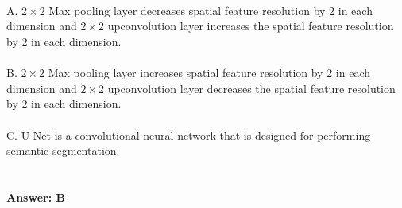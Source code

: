 \documentclass[prl,twocolumn,showpacs,preprintnumbers,superscriptaddress]{revtex4}
\theoremstyle{plain}
\theoremstyle{definition}
\begin{document}
\begin{widetext}
\\
\\
\\
A. $2 \times 2$ Max pooling layer decreases spatial feature resolution by $2$ in each dimension and $2 \times 2$ upconvolution layer increases the spatial feature resolution by $2$ in each dimension. \\
\\
B. $2 \times 2$ Max pooling layer increases spatial feature resolution by $2$ in each dimension and $2 \times 2$ upconvolution layer decreases the spatial feature resolution by $2$ in each dimension.
\\
\\
C. U-Net is a convolutional neural network that is designed for performing semantic segmentation.
\\
\\
\\
\textbf{Answer: B}
\\
\\
\\

\end{widetext}
\end{document}

